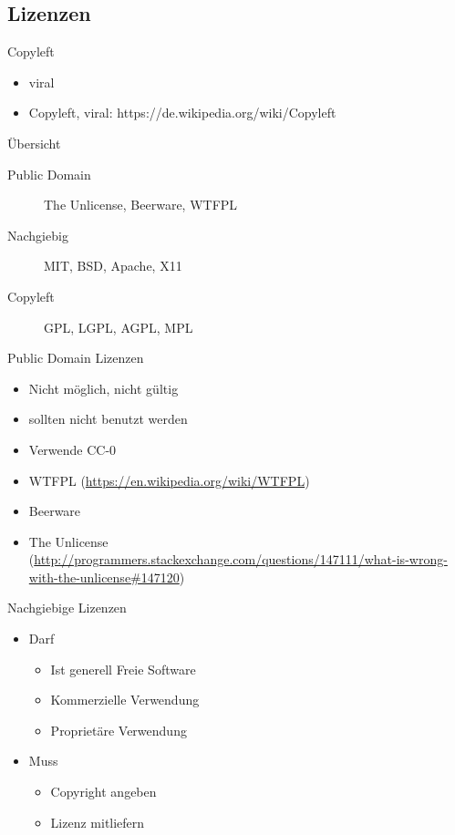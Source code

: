 \subsection{Lizenzen}
\subsectionframe

\begin{frame}{Copyleft}
	\begin{itemize}
		\item viral
	\end{itemize}
\end{frame}
\note
{
	\begin{itemize}
		\item Copyleft, viral: https://de.wikipedia.org/wiki/Copyleft
	\end{itemize}
}

\begin{frame}{Übersicht}
	\begin{description}
		\item[Public Domain] The Unlicense, Beerware, WTFPL
		\item[Nachgiebig] MIT, BSD, Apache, X11
		\item[Copyleft] GPL, LGPL, AGPL, MPL
	\end{description}
\end{frame}

\begin{frame}{Public Domain Lizenzen}
	\begin{itemize}
		\item Nicht möglich, nicht gültig
		\item sollten nicht benutzt werden
		\item Verwende CC-0
	\end{itemize}
\end{frame}
\note
{
	\begin{itemize}
		\item WTFPL (\url{https://en.wikipedia.org/wiki/WTFPL})
		\item Beerware
		\item The Unlicense (\url{http://programmers.stackexchange.com/questions/147111/what-is-wrong-with-the-unlicense\#147120})
	\end{itemize}
}

\begin{frame}{Nachgiebige Lizenzen}
	\begin{itemize}
		\item Darf
		\begin{itemize}
			\item Ist generell Freie Software
			\item Kommerzielle Verwendung
			\item Proprietäre Verwendung
		\end{itemize}
		\item Muss
		\begin{itemize}
			\item Copyright angeben
			\item Lizenz mitliefern
		\end{itemize}
	\end{itemize}
\end{frame}

